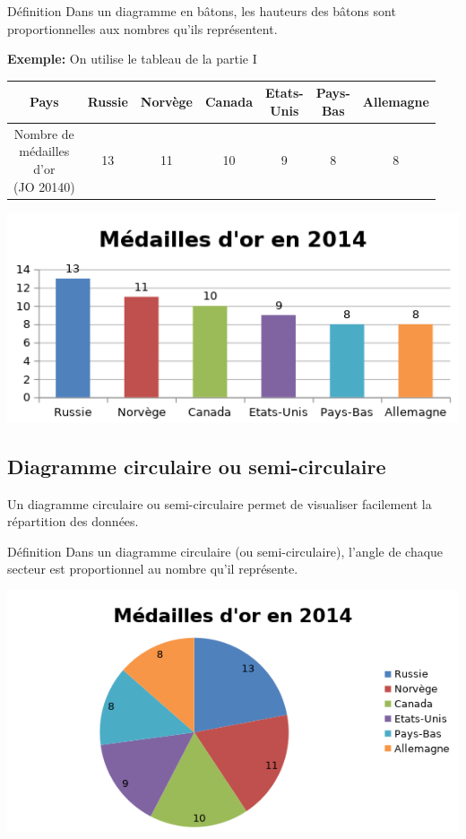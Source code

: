 \documentclass[12pt,a4paper]{article}
\begin{document}
\begin{definition}{Définition}
Dans un diagramme en bâtons, les hauteurs des bâtons sont proportionnelles aux nombres qu’ils représentent.
\end{definition}

\newpage

\textbf{Exemple:} On utilise le tableau de la partie I\\
\begin{center}
\begin{tabular}{|c|c|c|c|c|c|c|}
\hline
Pays       & Russie & Norvège & Canada & \thead{Etats-\\Unis} & \thead{Pays-\\Bas} & Allemagne
\\ \hline
\thead{Nombre de\\ médailles \\d’or\\ (JO 20140)}   & 13 & 11 & 10 & 9 & 8 & 8 \\ \hline
\end{tabular}
\includegraphics[scale=1]{img/diag-bat2.png} 
\end{center}

\subsection{Diagramme circulaire ou semi-circulaire}

Un diagramme circulaire ou semi-circulaire permet de visualiser facilement la répartition des données.\\

\begin{definition}{Définition}
Dans un diagramme circulaire (ou semi-circulaire), l’angle de chaque secteur est proportionnel au nombre qu’il représente.
\end{definition}

\includegraphics[scale=1]{img/diag-camb2.png} 
\end{document}
